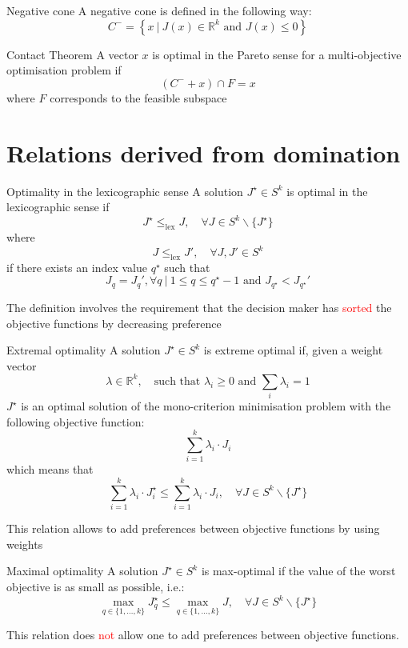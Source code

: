 \documentclass{book}
\newcommand{\R}{\mathbb{R}}
\begin{document}
\begin{Definition}{Negative cone}{}
    A negative cone is defined in the following way:
    \[
        C^- = \left\{x\ |\ J(x)\in\R^k \text{ and } J(x)\leq 0 \right\}
    \]
\end{Definition}
\begin{Theorem}{Contact Theorem}
    A vector $x$ is optimal in the Pareto sense for a multi-objective optimisation problem if 
    \[
        (C^-+x)\cap F = {x}
    \]
    where $F$ corresponds to the feasible subspace
\end{Theorem}
\section{Relations derived from domination}
\begin{Definition}{Optimality in the lexicographic sense}{}
    A solution $J^\star\in S^k$ is optimal in the lexicographic sense if 
    \[
        J^\star\leq_{\text{lex}}J, \quad \forall J \in S^k \backslash \{J^\star\}
    \]
    where 
    \[
        J \leq_{\text{lex}} J', \quad \forall J, J' \in S^k
    \]
    if there exists an index value $q^\star$ such that 
    \[
        J_q = J_q', \forall q\ |\ 1 \leq q \leq q^\star-1 \text{ and } J_{q^\star}<J_{q^\star}' 
    \]
\end{Definition}
The definition involves the requirement that the decision maker has \textcolor{red}{sorted} the objective functions by decreasing preference
\begin{Definition}{Extremal optimality}{}
    A solution $J^\star\in S^k$ is extreme optimal if, given a weight vector 
    \[
        \lambda\in\R^k, \quad \text{such that } \lambda_i\geq 0 \text{ and } \displaystyle\sum_{i}\lambda_i = 1
    \]
    $J^\star$ is an optimal solution of the mono-criterion minimisation problem with the following objective function: 
    \[
        \displaystyle\sum_{i=1}^{k}\lambda_i \cdot J_i
    \]
    which means that
    \[
        \displaystyle\sum_{i=1}^{k}\lambda_i \cdot J_i^\star\leq \displaystyle\sum_{i=1}^{k} \lambda_i\cdot J_i, \quad \forall J \in S^k\backslash\{J^\star\}
    \]
\end{Definition}
This relation allows to add preferences between objective functions by using weights
\newpage
\begin{Definition}{Maximal optimality}{}
    A solution $J^\star\in S^k$ is max-optimal if the value of the worst objective is as small as possible, i.e.:
    \[
        \max_{q\in\{1,\dots,k\}}J^\star_q\leq \max_{q\in\{1,\dots,k\}} J, \quad \forall J \in S^k\backslash \{J^\star\}
    \]
\end{Definition}
This relation does \textcolor{red}{not} allow one to add preferences between objective functions.
\end{document}
